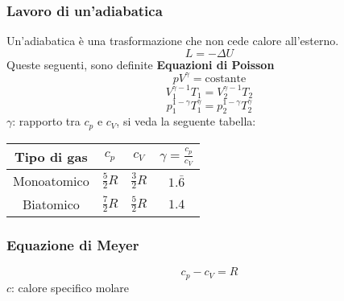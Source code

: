 \subsubsection{Lavoro di un'adiabatica}
Un'adiabatica è una trasformazione che non cede calore all'esterno.
\begin{equation*}
L = -\Delta U
\end{equation*}
Queste seguenti, sono definite \textbf{Equazioni di Poisson}
\begin{equation*}
pV^\gamma = \text{costante}
\end{equation*}
\begin{equation*}
V_1^{\gamma-1}T_1 = V_2^{\gamma-1}T_2
\end{equation*}
\begin{equation*}
p_1^{1-\gamma}T_1^\gamma = p_2^{1-\gamma}T_2^\gamma
\end{equation*}
$\gamma$: rapporto tra $c_p$ e $c_V$, si veda la seguente tabella:

\begin{center}
	\begin{tabular}{c | c | c | c}
		Tipo di gas & $c_p$ & $c_V$ & $\gamma=\frac{c_p}{c_V}$\\ \hline
		Monoatomico & $\frac{5}{2}R$ & $\frac{3}{2}R$ & $1.\bar{6}$\\ \hline
		Biatomico & $\frac{7}{2}R$ & $\frac{5}{2}R$ & $1.4$\\
	\end{tabular}
\end{center}

\subsubsection{Equazione di Meyer}
\begin{equation*}
c_p - c_V = R
\end{equation*}
$c$: calore specifico molare

